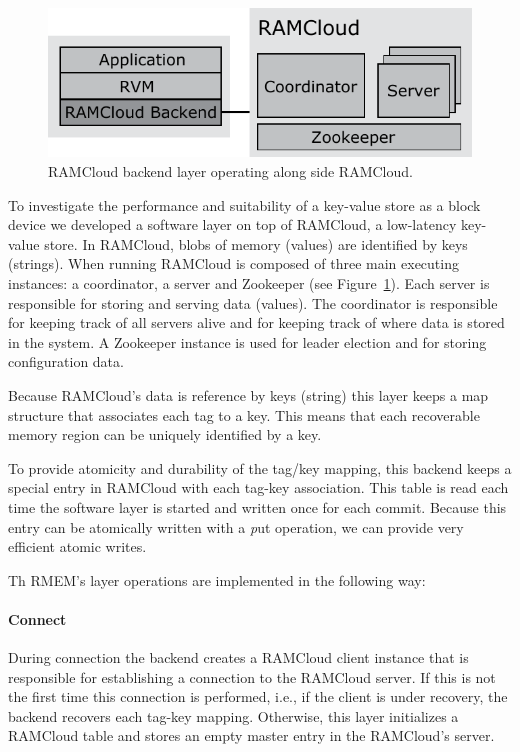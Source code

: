 
\begin{figure}[t!]
\begin{center}
\includegraphics[scale=0.60]{graphs/ramcloud_backend_design_final.pdf}
\end{center}
\caption{RAMCloud backend layer operating along side RAMCloud.}
\label{fig:ramcloud_backend_design}
\end{figure}


To investigate the performance and suitability of a key-value store as a block device we developed a software layer on top of RAMCloud, a low-latency key-value store.
In RAMCloud, blobs of memory (values) are identified by keys (strings). When running RAMCloud is composed of three main executing instances: a coordinator, a server and Zookeeper (see Figure~\ref{fig:ramcloud_backend_design}).
Each server is responsible for storing and serving data (values). The coordinator is responsible for keeping track of all servers alive and for keeping track of where data is stored in the system.
A Zookeeper instance is used for leader election and for storing configuration data.

Because RAMCloud's data is reference by keys (string) this layer keeps a map structure that associates each tag to a key. This means that each recoverable memory region can be uniquely identified by a key.

To provide atomicity and durability of the tag/key mapping, this backend keeps a special entry in RAMCloud with each tag-key association. This table is read each time the software layer is started and written once for each commit. Because this entry can be atomically written with a {\emph put} operation, we can provide very efficient atomic writes.

Th RMEM's layer operations are implemented in the following way:

\paragraph {\bf Connect} During connection the backend creates a RAMCloud client instance that is responsible for establishing a connection to the RAMCloud server.
If this is not the first time this connection is performed, i.e., if the client is under recovery, the backend recovers each tag-key mapping.
Otherwise, this layer initializes a RAMCloud table and stores an empty master entry in the RAMCloud's server.
